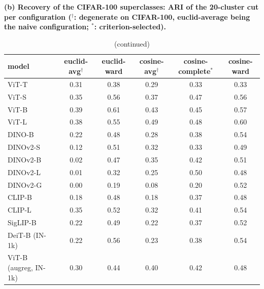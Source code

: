 \begin{table}[tbp]\ContinuedFloat
\centering
\scriptsize
\setlength{\tabcolsep}{2.6pt}
\begingroup
\noindent\textbf{(b) Recovery of the CIFAR-100 superclasses: ARI of the 20-cluster cut per configuration ($^{\dagger}$: degenerate on CIFAR-100, euclid-average being the naive configuration; $^{*}$: criterion-selected).}\par\vspace{1.5pt}
\footnotesize
\setlength{\tabcolsep}{4pt}
\begin{tabular}{lccccc}
\toprule
model & euclid-avg$^{\dagger}$ & euclid-ward & cosine-avg$^{\dagger}$ & cosine-complete$^{*}$ & cosine-ward \\
\midrule
ViT-T & 0.31 & 0.38 & 0.29 & 0.33 & 0.33 \\
ViT-S & 0.35 & 0.56 & 0.37 & 0.47 & 0.56 \\
ViT-B & 0.39 & 0.61 & 0.43 & 0.45 & 0.57 \\
ViT-L & 0.38 & 0.55 & 0.49 & 0.48 & 0.60 \\
\midrule
DINO-B & 0.22 & 0.48 & 0.28 & 0.38 & 0.54 \\
DINOv2-S & 0.12 & 0.51 & 0.32 & 0.33 & 0.49 \\
DINOv2-B & 0.02 & 0.47 & 0.35 & 0.42 & 0.51 \\
DINOv2-L & 0.01 & 0.32 & 0.25 & 0.50 & 0.48 \\
DINOv2-G & 0.00 & 0.19 & 0.08 & 0.20 & 0.52 \\
\midrule
CLIP-B & 0.18 & 0.48 & 0.18 & 0.37 & 0.48 \\
CLIP-L & 0.35 & 0.52 & 0.32 & 0.41 & 0.54 \\
SigLIP-B & 0.22 & 0.49 & 0.22 & 0.37 & 0.52 \\
\midrule
DeiT-B (IN-1k) & 0.22 & 0.56 & 0.23 & 0.38 & 0.54 \\
ViT-B (augreg, IN-1k) & 0.30 & 0.44 & 0.40 & 0.42 & 0.48 \\
\bottomrule
\end{tabular}
\par\vspace{5pt}
\endgroup
\caption{(continued)}
\end{table}
